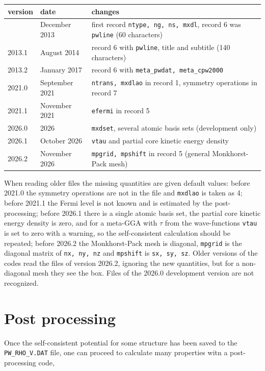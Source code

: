 \documentclass[11pt]{article}
\begin{document}
\begin{longtable}{llp{9.5cm}}
\hline
version & date & changes \\
\hline
\endhead
\hline
\endfoot
2013.0 & December 2013 & first record \texttt{ntype, ng, ns, mxdl}, record 6 was \texttt{pwline} (60 characters) \\
2013.1 & August 2014   & record 6 with \texttt{pwline}, title and subtitle (140 characters) \\
2013.2 & January 2017  & record 6 with \texttt{meta\_pwdat, meta\_cpw2000} \\
2021.0 & September 2021 & \texttt{ntrans, mxdlao} in record 1, symmetry operations in record 7 \\
2021.1 & November 2021 & \texttt{efermi} in record 5 \\
2026.0 & 2026          & \texttt{mxdset}, several atomic basis sets (development only) \\
2026.1 & October 2026  & \texttt{vtau} and partial core kinetic energy density \\
2026.2 & November 2026 & \texttt{mpgrid, mpshift} in record 5 (general Monkhorst-Pack mesh) \\
\end{longtable}

When reading older files the missing quantities are given default values:
before 2021.0 the symmetry operations are not in the file and \texttt{mxdlao} is taken as 4;
before 2021.1 the Fermi level is not known and is estimated by the post-processing;
before 2026.1 there is a single atomic basis set, the partial core kinetic energy density
is zero, and for a meta-GGA with $\tau$ from the wave-functions \texttt{vtau} is set to zero
with a warning, so the self-consistent calculation should be repeated;
before 2026.2 the Monkhorst-Pack mesh is diagonal, \texttt{mpgrid} is the diagonal
matrix of \texttt{nx, ny, nz} and \texttt{mpshift} is \texttt{sx, sy, sz}.
Older versions of the codes read the files of version 2026.2, ignoring the new
quantities, but for a non-diagonal mesh they see the box.
Files of the 2026.0 development version are not recognized.



\section{Post processing}

Once the self-consistent potential for some structure has been saved to the {\tt PW\_RHO\_V.DAT} file,
one can proceed to calculate many properties witn a post-processing code,
\end{document}
